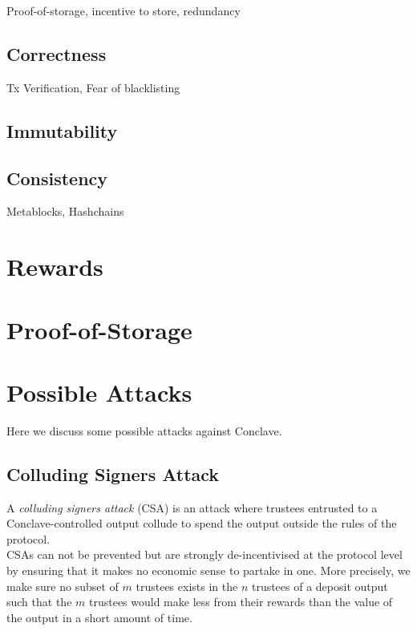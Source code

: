 \documentclass{article}
\begin{document}
Proof-of-storage, incentive to store, redundancy

\subsection{Correctness}

Tx Verification, Fear of blacklisting

\subsection{Immutability}

\subsection{Consistency}

Metablocks, Hashchains

\section{Rewards}

\section{Proof-of-Storage}

\section{Possible Attacks}

Here we discuss some possible attacks against Conclave.

\subsection{Colluding Signers Attack}

A \textit{colluding signers attack} (CSA) is an attack where trustees entrusted to a Conclave-controlled output collude to spend the output outside the rules of the protocol. \\

CSAs can not be prevented but are strongly de-incentivised at the protocol level by ensuring that it makes no economic sense to partake in one. More precisely, we make sure no subset of $m$ trustees exists in the $n$ trustees of a deposit output such that the $m$ trustees would make less from their rewards than the value of the output in a short amount of time. \\
\end{document}
